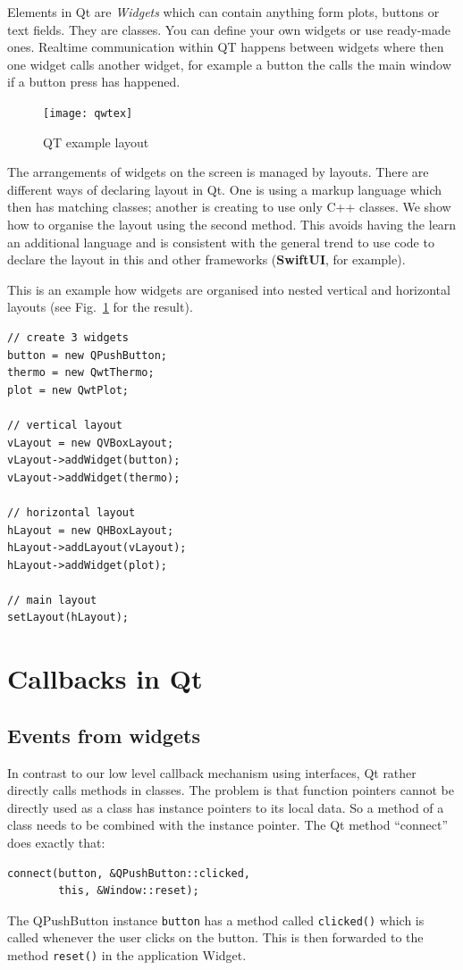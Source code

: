 \documentclass[12pt]{report}
\begin{document}
Elements in Qt are \textsl{Widgets} which can contain anything form
plots, buttons or text fields. They are classes. You can define your
own widgets or use ready-made ones. Realtime communication within QT
happens between widgets where then one widget calls another widget,
for example a button the calls the main window if a button press has
happened.

\begin{figure}[!hbt]
\begin{center}
\mbox{\texttt{[image: qwtex]}}
\end{center}
\caption{QT example layout
\label{qwtex}}
\end{figure}

The arrangements of widgets on the screen is managed by
layouts. There are different ways of declaring layout in Qt. One is
using a markup language which then has matching classes;
another is creating to use only C++ classes.
We show how to organise the layout using the second method.
This avoids having the learn an additional language and is
consistent with the general  trend to use code to declare the layout
in this and other frameworks (\textbf{SwiftUI}, for example).

This is an example how widgets are organised into
nested vertical and horizontal layouts (see Fig.~\ref{qwtex}
for the result).
\begin{verbatim}
// create 3 widgets
button = new QPushButton;
thermo = new QwtThermo; 
plot = new QwtPlot;

// vertical layout
vLayout = new QVBoxLayout;
vLayout->addWidget(button);
vLayout->addWidget(thermo);

// horizontal layout
hLayout = new QHBoxLayout;
hLayout->addLayout(vLayout);
hLayout->addWidget(plot);

// main layout
setLayout(hLayout);
\end{verbatim}


\section{Callbacks in Qt}
\subsection{Events from widgets}
In contrast to our low level callback mechanism using interfaces, Qt rather
directly calls methods in classes. The problem is that function pointers
cannot be directly used as a class has instance pointers to its local
data. So a method of a class needs to be combined with the instance
pointer. The Qt method ``connect'' does exactly that:
\begin{verbatim}
connect(button, &QPushButton::clicked,
        this, &Window::reset);
\end{verbatim}
The QPushButton instance \texttt{button} has a method called \texttt{clicked()} which is
called whenever the user clicks on the button. This is then forwarded to the
method \texttt{reset()} in the application Widget.
\end{document}
